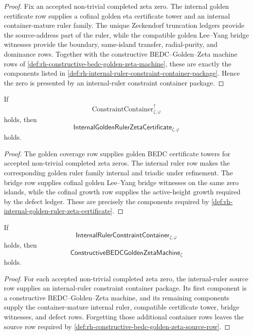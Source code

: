 \begin{proof}
Fix an accepted non-trivial completed zeta zero.  The internal golden
certificate row supplies a cofinal golden eta certificate tower and an
internal container-mature ruler family.  The unique Zeckendorf
truncation ledgers provide the source-address part of the ruler, while
the compatible golden Lee--Yang bridge witnesses provide the boundary,
same-island transfer, radial-purity, and dominance rows.  Together with
the constructive BEDC--Golden--Zeta machine rows of
\autoref{def:rh-constructive-bedc-golden-zeta-machine}, these are
exactly the components listed in
\autoref{def:rh-internal-ruler-constraint-container-package}.  Hence
the zero is presented by an internal-ruler constraint container package.
\end{proof}

\begin{theorem}
\label{thm:rh-golden-zeta-container-route-supplies-internal-golden-certificates}
If
$$
\mathrm{ConstraintContainer}^{\uparrow}_{\zeta,\varphi}
$$
holds, then
$$
\mathsf{InternalGoldenRulerZetaCertificate}_{\zeta,\varphi}
$$
holds.
\end{theorem}

\begin{proof}
The golden coverage row supplies golden BEDC certificate towers for
accepted non-trivial completed zeta zeros.  The internal ruler row makes
the corresponding golden ruler family internal and triadic under
refinement.  The bridge row supplies cofinal golden Lee--Yang bridge
witnesses on the same zero islands, while the cofinal growth row supplies
the active-height growth required by the defect ledger.  These are
precisely the components required by
\autoref{def:rh-internal-golden-ruler-zeta-certificate}.
\end{proof}

\begin{theorem}
\label{thm:rh-internal-ruler-containers-supply-constructive-machines}
If
$$
\mathsf{InternalRulerConstraintContainer}_{\zeta,\varphi}
$$
holds, then
$$
\mathsf{ConstructiveBEDCGoldenZetaMachine}_{\zeta}
$$
holds.
\end{theorem}

\begin{proof}
For each accepted non-trivial completed zeta zero, the
internal-ruler source row supplies an internal-ruler constraint
container package.  Its first component is a constructive
BEDC--Golden--Zeta machine, and its remaining components supply the
container-mature internal ruler, compatible certificate tower, bridge
witnesses, and defect rows.  Forgetting those additional container rows
leaves the source row required by
\autoref{def:rh-constructive-bedc-golden-zeta-source-row}.
\end{proof}


